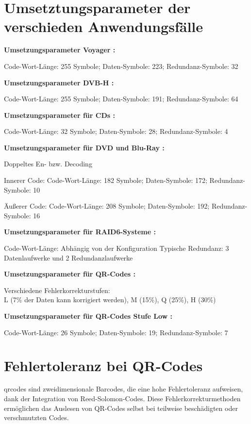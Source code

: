\section{Umsetztungsparameter der verschieden Anwendungsfälle}\label{app:parameter}

\textbf{Umsetzungsparameter Voyager \cite{ludwigVoyagerTelecommunications2002}:}

Code-Wort-Länge: 255 Symbole;
Daten-Symbole: 223;
Redundanz-Symbole: 32

\textbf{Umsetzungsparameter DVB-H \cite{DVBH2024}:}

Code-Wort-Länge: 255 Symbole;
Daten-Symbole: 191;
Redundanz-Symbole: 64

\textbf{Umsetzungsparameter für CDs \cite{wickerReedSolomonCodes1994}:}

Code-Wort-Länge: 32 Symbole;
Daten-Symbole: 28;
Redundanz-Symbole: 4

\textbf{Umsetzungsparameter für DVD und Blu-Ray \cite{changReedSolomonProductCodeRSPC1998}:}

Doppeltes En- bzw. Decoding

Innerer Code:
Code-Wort-Länge: 182 Symbole;
Daten-Symbole: 172;
Redundanz-Symbole: 10

Äußerer Code:
Code-Wort-Länge: 208 Symbole;
Daten-Symbole: 192;
Redundanz-Symbole: 16

\textbf{Umsetzungsparameter für RAID6-Systeme \cite{RAIDStorageTechnology2021}:}

Code-Wort-Länge: Abhängig von der Konfiguration
Typische Redundanz: 3 Datenlaufwerke und 2 Redundanzlaufwerke

\textbf{Umsetzungsparameter für QR-Codes \cite{QRCode2024}:}

Verschiedene Fehlerkorrekturstufen: \\ L (7\% der Daten kann korrigiert werden), M (15\%), Q (25\%), H (30\%)

\textbf{Umsetzungsparameter für QR-Codes Stufe Low \cite{QRCode2024}:}

Code-Wort-Länge: 26 Symbole;
Daten-Symbole: 19;
Redundanz-Symbole: 7

\section{Fehlertoleranz bei QR-Codes}\label{app:qr-code}

\acrlong{qrcode}s sind zweidimensionale Barcodes, die eine hohe Fehlertoleranz aufweisen, dank der Integration von Reed-Solomon-Codes.
Diese Fehlerkorrekturmethoden ermöglichen das Auslesen von QR-Codes selbst bei teilweise beschädigten oder verschmutzten Codes. 

